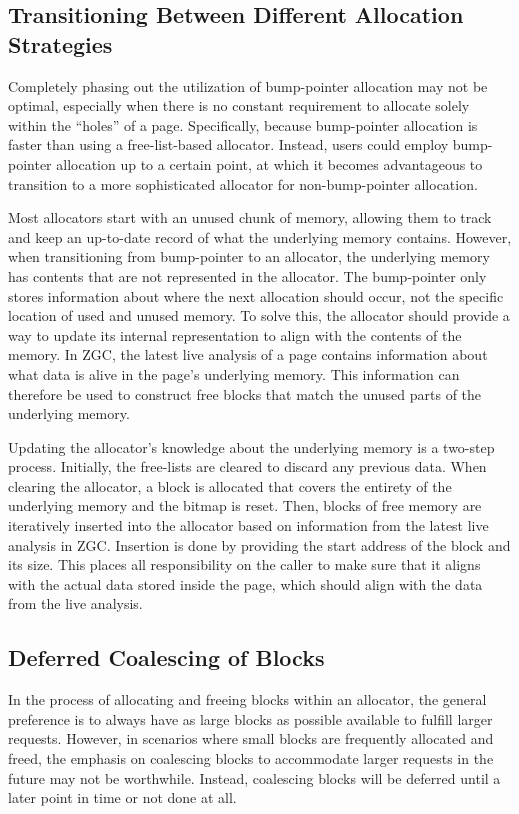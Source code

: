 \subsection{Transitioning Between Different Allocation Strategies}

Completely phasing out the utilization of bump-pointer allocation may not be optimal, especially when there is no constant requirement to allocate solely within the ``holes'' of a page. Specifically, because bump-pointer allocation is faster than using a free-list-based allocator. Instead, users could employ bump-pointer allocation up to a certain point, at which it becomes advantageous to transition to a more sophisticated allocator for non-bump-pointer allocation.

Most allocators start with an unused chunk of memory, allowing them to track and keep an up-to-date record of what the underlying memory contains. However, when transitioning from bump-pointer to an allocator, the underlying memory has contents that are not represented in the allocator. The bump-pointer only stores information about where the next allocation should occur, not the specific location of used and unused memory. To solve this, the allocator should provide a way to update its internal representation to align with the contents of the memory. In ZGC, the latest live analysis of a page contains information about what data is alive in the page's underlying memory. This information can therefore be used to construct free blocks that match the unused parts of the underlying memory.

Updating the allocator's knowledge about the underlying memory is a two-step process. Initially, the free-lists are cleared to discard any previous data. When clearing the allocator, a block is allocated that covers the entirety of the underlying memory and the bitmap is reset. Then, blocks of free memory are iteratively inserted into the allocator based on information from the latest live analysis in ZGC. Insertion is done by providing the start address of the block and its size. This places all responsibility on the caller to make sure that it aligns with the actual data stored inside the page, which should align with the data from the live analysis.

\subsection{Deferred Coalescing of Blocks}

In the process of allocating and freeing blocks within an allocator, the general preference is to always have as large blocks as possible available to fulfill larger requests. However, in scenarios where small blocks are frequently allocated and freed, the emphasis on coalescing blocks to accommodate larger requests in the future may not be worthwhile. Instead, coalescing blocks will be deferred until a later point in time or not done at all.

